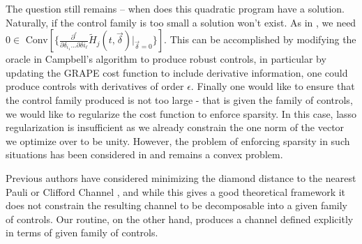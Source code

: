 \documentclass[aps,nofootinbib,pra,notitlepage,twocolumn]{revtex4-1}
\begin{document}
The question still remains -- when does this quadratic program have a solution. Naturally, if the control family is too small a solution won't exist. As in \cite{Campbell2017}, we need  $0\in $ Conv$[\{\frac{\partial^{\ell}}{\partial\delta_{i_1}...\partial\delta{i_\ell}}\tilde{H}_j(t,\vec{\delta})|_{\vec{\delta}=0}\}]$. This can be accomplished by modifying the oracle in Campbell's algorithm to produce robust controls, in particular by updating the GRAPE cost function to include derivative information, one could produce controls with derivatives of order $\epsilon$. Finally one would like to ensure that the control family produced is not too large - that is given the family of controls, we would like to regularize the cost function to enforce sparsity. In this case, lasso regularization is insufficient as we already constrain the one norm of the vector we optimize over to be unity. However, the problem of enforcing sparsity in such situations has been considered in \cite{NIPS2012_4504} and remains a convex problem.



Previous authors have considered minimizing the diamond distance to the nearest Pauli or Clifford Channel \cite{Magesan2013}, and while this gives a good theoretical framework it does not constrain the resulting channel to be decomposable into a given family of controls. Our routine, on the other hand, produces a channel defined explicitly in terms of given family of controls.

\end{document}
